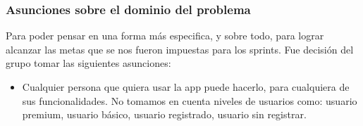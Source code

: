 \subsubsection{Asunciones sobre el dominio del problema}

Para poder pensar en una forma más especifica, y sobre todo, para lograr alcanzar las metas que se nos fueron impuestas para los sprints. Fue decisión del grupo tomar las siguientes asunciones:

\begin{itemize}
\item Cualquier persona que quiera usar la app puede hacerlo, para cualquiera de sus funcionalidades. No tomamos en cuenta niveles de usuarios como: usuario premium, usuario básico, usuario registrado, usuario sin registrar.
\end{itemize}
